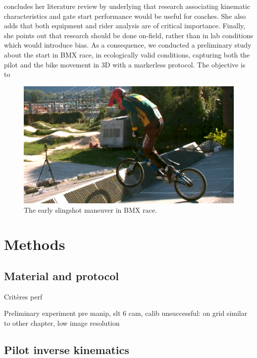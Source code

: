 \cite{Grigg2017} concludes her literature review by underlying that research associating kinematic characteristics and gate start performance would be useful for coaches. She also adds that both equipment and rider analysis are of critical importance. Finally, she points out that research should be done on-field, rather than in lab conditions which would introduce bias. As a consequence, we conducted a preliminary study about the start in BMX race, in ecologically valid conditions, capturing both the pilot and the bike movement in 3D with a markerless protocol. The objective is to 

\begin{figure}[hbtp]
	\centering
	\def\svgwidth{1\columnwidth}
	\fontsize{10pt}{10pt}\selectfont
	\includegraphics[width=\linewidth]{"../Chap7/Figures/BMXStart.PNG"}
	\caption{The early slingshot maneuver in BMX race.}
	\label{fig_bmxstart}
\end{figure}


\section{Methods}

\subsection{Material and protocol}


Critères perf


Preliminary experiment
pre manip, slt 6 cam, calib unsuccessful: on grid similar to other chapter, low image resolution

\subsection{Pilot inverse kinematics}


